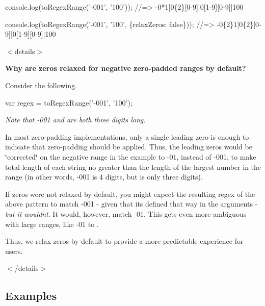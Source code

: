 \begin{DoxyCode}
console.log(toRegexRange('-001', '100'));
//=> -0*1|0\{2\}[0-9]|0[1-9][0-9]|100

console.log(toRegexRange('-001', '100', \{relaxZeros: false\}));
//=> -0\{2\}1|0\{2\}[0-9]|0[1-9][0-9]|100
\end{DoxyCode}


$<$details$>$ 

{\bfseries Why are zeros relaxed for negative zero-\/padded ranges by default?}

Consider the following.


\begin{DoxyCode}
var regex = toRegexRange('-001', '100');
\end{DoxyCode}


{\itshape Note that {\ttfamily -\/001} and {} are both three digits long}.

In most zero-\/padding implementations, only a single leading zero is enough to indicate that zero-\/padding should be applied. Thus, the leading zeros would be \char`\"{}corrected\char`\"{} on the negative range in the example to {\ttfamily -\/01}, instead of {\ttfamily -\/001}, to make total length of each string no greater than the length of the largest number in the range (in other words, {\ttfamily -\/001} is 4 digits, but {} is only three digits).

If zeros were not relaxed by default, you might expect the resulting regex of the above pattern to match {\ttfamily -\/001} -\/ given that it\textquotesingle{}s defined that way in the arguments -\/ {\itshape but it wouldn\textquotesingle{}t}. It would, however, match {\ttfamily -\/01}. This gets even more ambiguous with large ranges, like {\ttfamily -\/01} to {}.

Thus, we relax zeros by default to provide a more predictable experience for users.

$<$/details$>$

\subsection*{Examples}

